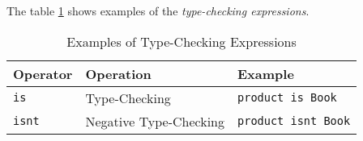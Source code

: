 The table \ref{tab:type-checking-examples} shows examples of
the \emph{type-checking expressions}.

\begin{table}[H]
\centering
\begin{tabular}
{ l l l }
\hline
Operator & Operation & Example \\
\hline
\verb|is| & Type-Checking & \verb|product is Book| \\
\verb|isnt| & Negative Type-Checking & \verb|product isnt Book| \\
\end{tabular}
\caption{Examples of Type-Checking Expressions}
\label{tab:type-checking-examples}
\end{table}
